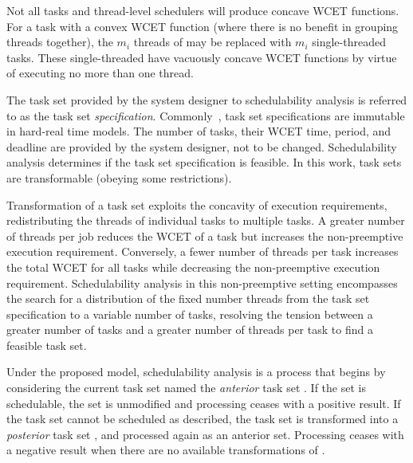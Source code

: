 Not all tasks and thread-level schedulers will produce concave WCET
functions. For a task  with a convex WCET function (where
there is no benefit in grouping threads together), the
${m_i}$ threads of  may be replaced with ${m_i}$
single-threaded tasks. These single-threaded have vacuously concave
WCET functions by virtue of executing no more than one thread.

The task set \tasks{} provided by the system designer to
schedulability analysis is referred to as the task set
\emph{specification}. Commonly~\cite{Baruah:1990,Liu:1973,Baruah:2005,Bertogna:2011,Burns:1995,Buttazzo:2011}, task set specifications are immutable
in hard-real time models. The number of tasks, their
WCET time, period, and deadline are provided by the system
designer, not to be changed. Schedulability analysis determines if
the task set specification is feasible. In this work, task sets are
transformable (obeying some restrictions).

Transformation of a task set exploits the concavity of execution
requirements, redistributing the threads of individual tasks to
multiple tasks. A greater number of threads per job reduces the WCET
of a task but increases the non-preemptive execution
requirement. Conversely, a fewer number of threads per task increases
the total WCET for all tasks while decreasing the non-preemptive
execution requirement. Schedulability analysis in this non-preemptive
setting  encompasses the search for a distribution of the fixed number
threads from the task set specification to a variable number of tasks,
resolving the tension between a greater number of tasks and a
greater number of threads per task to find a feasible task set. 
 
Under the proposed model, schedulability analysis is a process that
begins by considering the current task set named the \emph{anterior}
task set \supts{}. If the set is schedulable, the set is unmodified and
processing ceases with a positive result. If the task set \supts{}
cannot be scheduled as described, the task set is transformed into a
\emph{posterior} task set \tasks{}, and processed again as an anterior
set. Processing ceases with a negative result when there are no
available transformations of \supts{}.



